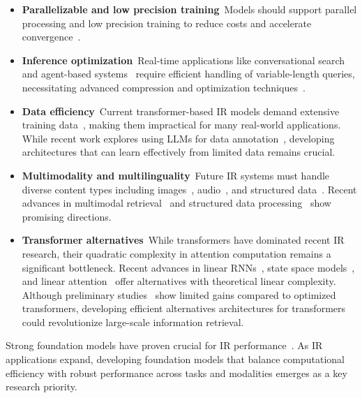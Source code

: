 \begin{itemize}[leftmargin=*]
    \item \textbf{Parallelizable and low precision training}\,
    Models should support parallel processing and low precision training to reduce costs and accelerate convergence~\cite{pool2021nvidia,fishman2024scaling,liu2024deepseek}.
    \item \textbf{Inference optimization}\, Real-time applications like conversational search~\cite{mo2024survey} and agent-based systems~\cite{yao2023react} require efficient handling of variable-length queries, necessitating advanced compression and optimization techniques~\cite{dettmers2023case,kumar2024scaling,bruch2024efficient}.
    \item \textbf{Data efficiency}\, Current transformer-based IR models demand extensive training data~\cite{fang2024scaling}, making them impractical for many real-world applications. While recent work explores using LLMs for data annotation~\cite{tan2024large,faggioli2023perspectives,clarke2024llm}, developing architectures that can learn effectively from limited data remains crucial.
    \item \textbf{Multimodality and multilinguality}\, Future IR systems must handle diverse content types including images~\cite{ma-etal-2024-unifying}, audio~\cite{pusateri2024retrieval}, and structured data~\cite{tan2024htmlrag,edge2024local}. Recent advances in multimodal retrieval~\cite{ma-etal-2024-unifying,wei2025uniir} and structured data processing~\cite{li2023structure,li2024multi} show promising directions.
    \item \textbf{Transformer alternatives}\, 
    While transformers have dominated recent IR research, their quadratic complexity in attention computation remains a significant bottleneck. Recent advances in linear RNNs~\cite{peng-etal-2023-rwkv,peng2024eagle,qin2024hierarchically}, state space models~\cite{gu2024mamba,dao2024mamba2}, and linear attention~\cite{katharopoulos2020transformers,yang2024gated} offer alternatives with theoretical linear complexity. Although preliminary studies~\cite{xu2024state} show limited gains compared to optimized transformers, developing efficient alternatives architectures for transformers could revolutionize large-scale information retrieval.
\end{itemize}

\noindent
Strong foundation models have proven crucial for IR performance~\cite{neelakantan2022text,ma2024fine}. As IR applications expand, developing foundation models that balance computational efficiency with robust performance across tasks and modalities emerges as a key research priority.

